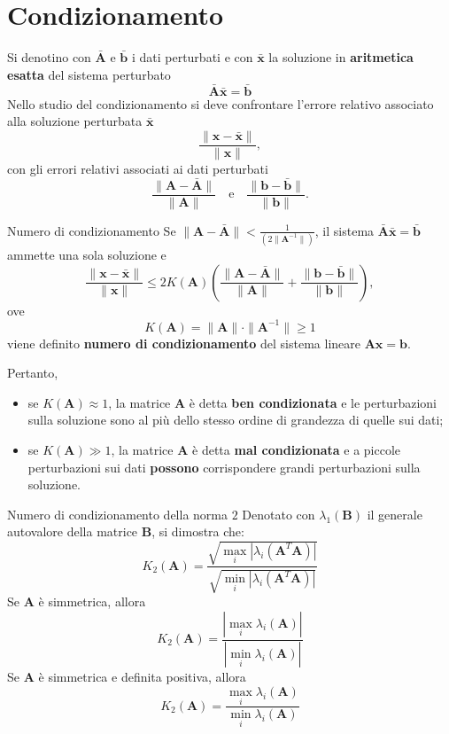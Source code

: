 \section{Condizionamento}

Si denotino con $\mathbf{\bar{A}}$ e $\mathbf{\bar{b}}$ i dati perturbati e con $\mathbf{\bar{x}}$
la soluzione in \textbf{aritmetica esatta} del sistema perturbato
\[\mathbf{\bar{A}}\mathbf{\bar{x}}=\mathbf{\bar{b}}\]
Nello studio del condizionamento si deve confrontare l'errore relativo associato alla soluzione
perturbata $\bar{\mathbf{x}}$
\[\frac{\|\mathbf{x}-\mathbf{\bar{x}}\|}{\|\mathbf{x}\|},\]
con gli errori relativi associati ai dati perturbati
\[\frac{\|\mathbf{A}-\mathbf{\bar{A}}\|}{\|\mathbf{A}\|}\quad\text{e}\quad
\frac{\|\mathbf{b}-\mathbf{\bar{b}}\|}{\|\mathbf{b}\|}.\]
\begin{theorem}{Numero di condizionamento}
    Se $\displaystyle\|\mathbf{A}-\mathbf{\bar{A}}\|<\frac{1}{(2\|\mathbf{A}^{-1}\|)}$, il sistema
    $\mathbf{\bar{A}}\mathbf{\bar{x}}=\mathbf{\bar{b}}$ ammette una sola soluzione e
    \[\frac{\|\mathbf{x}-\mathbf{\bar{x}}\|}{\|\mathbf{x}\|}\leq 2K(\mathbf{A})
    \left(\frac{\|\mathbf{A}-\mathbf{\bar{A}}\|}{\|\mathbf{A}\|}+\frac{\|\mathbf{b}-\mathbf{\bar{b}}
    \|}{\|\mathbf{b}\|}\right),\]
    ove
    \[K(\mathbf{A})=\|\mathbf{A}\|\cdot\|\mathbf{A}^{-1}\|\geq1\]
    viene definito \textbf{numero di condizionamento} del sistema lineare $\mathbf{Ax}=\mathbf{b}$.
\end{theorem}

Pertanto,
\begin{itemize}
    \item se $K(\mathbf{A})\approx1$, la matrice $\mathbf{A}$ è detta \textbf{ben condizionata} e le
    perturbazioni sulla soluzione sono al più dello stesso ordine di grandezza di quelle sui dati;
    \item se $K(\mathbf{A})\gg1$, la matrice $\mathbf{A}$ è detta \textbf{mal condizionata} e a
    piccole perturbazioni sui dati \textbf{possono} corrispondere grandi perturbazioni sulla soluzione.
\end{itemize}

\begin{observation}{Numero di condizionamento della norma $2$}
    Denotato con $\lambda_1(\mathbf{B})$ il generale autovalore della matrice $\mathbf{B}$, si dimostra che:
    \[K_2(\mathbf{A})=\frac{\sqrt{\max_i{\left|\lambda_i(\mathbf{A}^T\mathbf{A})\right|}}}
    {\sqrt{\min_i{\left|\lambda_i(\mathbf{A}^T\mathbf{A})\right|}}}\]
    Se $\mathbf{A}$ è simmetrica, allora
    \[K_2(\mathbf{A})=\frac{\left|\max_i{\lambda_i(\mathbf{A})}\right|}{\left|\min_i{\lambda_i(
    \mathbf{A})}\right|}\]
    Se $\mathbf{A}$ è simmetrica e definita positiva, allora
    \[K_2(\mathbf{A})=\frac{\max_i{\lambda_i(\mathbf{A})}}{\min_i{\lambda_i(\mathbf{A})}}\]
\end{observation}

